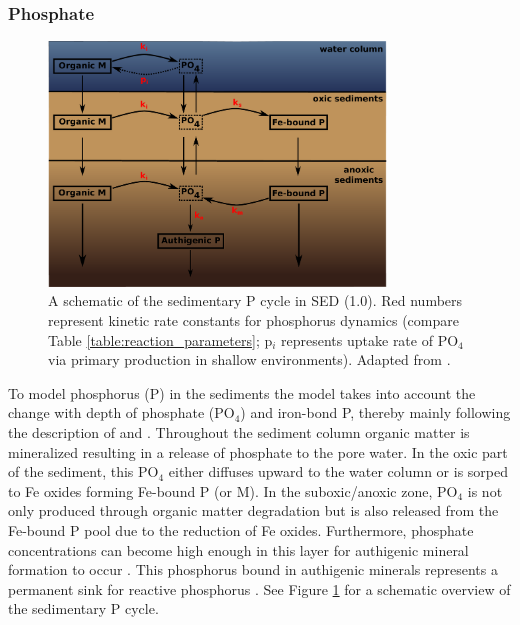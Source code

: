 \documentclass[gmd, manuscript]{copernicus}
\begin{document}
\subsubsection{Phosphate}
\begin{figure}[htbp]
\begin{center}
	\includegraphics[width=0.8\textwidth]{figures/P-cycle.pdf}
	\caption{A schematic of the sedimentary P cycle in SED (1.0). Red numbers represent kinetic rate constants for phosphorus dynamics (compare Table \ref{table:reaction_parameters}; p$_i$ represents uptake rate of PO$_4$ 
	via primary production in shallow environments). Adapted from \citet{caroline_p_slomp_key_1996}.}
	\label{fig:P-cycle}
	\end{center}
\end{figure}
To model phosphorus (P) in the sediments the model takes into account the change with depth of phosphate (PO$_4$) and iron-bond P, thereby mainly following the description of \citet{caroline_p_slomp_key_1996} 
and \citet{gypens_simple_2008}. Throughout the sediment column organic matter is mineralized resulting in a release of phosphate to the pore water. In the oxic part of the sediment, this PO$_4$ either 
diffuses upward to the water column or is sorped to Fe oxides forming Fe-bound P (or M)\citep{slomp1998role}. In the suboxic/anoxic zone, PO$_4$ is not only produced through organic matter degradation but is 
also released from the Fe-bound P pool due to the reduction of Fe oxides. Furthermore, phosphate concentrations can become high enough in this layer for authigenic mineral formation to occur \citep{cappellen_mathematical_1988}. 
This phosphorus bound in authigenic minerals represents a permanent sink for reactive phosphorus \citep{caroline_p_slomp_key_1996}. See Figure \ref{fig:P-cycle} for a schematic overview of the sedimentary P cycle.
\end{document}
